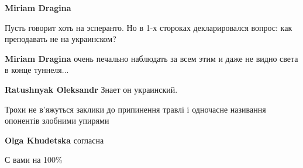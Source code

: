 \begin{itemize}
\begin{itemize}
 
\textbf{Miriam Dragina} 

Пусть говорит хоть на эсперанто. Но в 1-х стороках декларировался вопрос: как
преподавать не на украинском?

 
\textbf{Miriam Dragina} очень печально наблюдать за всем этим и даже не видно света в конце туннеля...

 
\textbf{Ratushnyak Oleksandr} Знает он украинский.

\end{itemize}

 

Трохи не в'яжуться заклики до припинення травлі і одночасне називання опонентів
злобними упирями

 
\textbf{Olga Khudetska} согласна

 
С вами на 100\%

 


\end{itemize}
